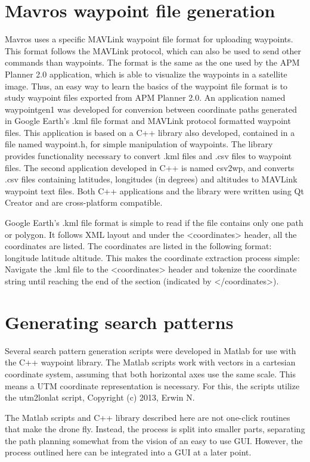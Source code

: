 \section{Mavros waypoint file generation}
\label{waypointgen}
Mavros uses a specific MAVLink waypoint file format for uploading waypoints.
This format follows the MAVLink protocol, which can also be used to send other commands than waypoints.
The format is the same as the one used by the APM Planner 2.0 application,
which is able to visualize the waypoints in a satellite image.
Thus, an easy way to learn the basics of the waypoint file format
is to study waypoint files exported from APM Planner 2.0.
An application named waypointgen1 was developed for conversion between coordinate paths generated
in Google Earth's .kml file format
and MAVLink protocol formatted waypoint files.
This application is based on a C++ library also developed, contained in a file named waypoint.h,
for simple manipulation of waypoints.
The library provides functionality necessary to
convert .kml files and .csv files to waypoint files.
The second application developed in C++ is named csv2wp, and converts .csv files containing
latitudes, longitudes (in degrees) and altitudes to MAVLink waypoint text files.
Both C++ applications and the library were written using Qt Creator and are cross-platform compatible.

Google Earth's .kml file format is simple to read if the file contains only one path or polygon.
It follows XML layout and under the <coordinates> header, all the coordinates are listed.
The coordinates are listed in the following format: longitude latitude altitude.
This makes the coordinate extraction process simple: Navigate the .kml file to the \textless{}coordinates\textgreater{}
header and tokenize the coordinate string until reaching the end of the section (indicated by
\textless{}/coordinates\textgreater{}).

\section{Generating search patterns}
\label{sec:searchpatterns}
Several search pattern generation scripts were developed in Matlab for use with the C++ waypoint
library.
The Matlab scripts work with vectors in a cartesian coordinate system, assuming that both horizontal axes
use the same scale. This means a UTM coordinate representation is necessary. For this, the scripts
utilize the utm2lonlat script, Copyright (c) 2013, Erwin N.

The Matlab scripts and C++ library described here are not one-click routines that make the drone fly.
Instead, the process is split into smaller parts, separating the path planning somewhat from the vision of an easy to use GUI.
However, the process outlined here can be integrated into a GUI at a later point.

